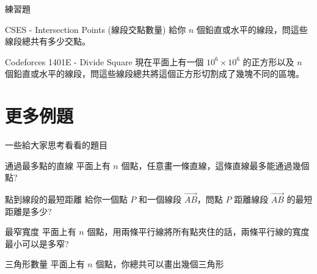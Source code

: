 \documentclass[aspectratio=169]{beamer}
\begin{document}
\begin{frame}{練習題}
    \begin{block}{CSES - Intersection Points (線段交點數量)}
        給你 $n$ 個鉛直或水平的線段，問這些線段總共有多少交點。
    \end{block}
    
    \begin{block}{Codeforces 1401E - Divide Square}
        現在平面上有一個 $10^6 \times 10^6$ 的正方形以及 $n$ 個鉛直或水平的線段，問這些線段總共將這個正方形切割成了幾塊不同的區塊。
    \end{block}
\end{frame}

\section{更多例題}

\begin{frame}{一些給大家思考看看的題目}
    \begin{block}{通過最多點的直線}
        平面上有 $n$ 個點，任意畫一條直線，這條直線最多能通過幾個點?
    \end{block}
    
    \begin{block}{點到線段的最短距離}
        給你一個點 $P$ 和一個線段 $\overrightarrow{AB}$，問點 $P$ 距離線段 $\overrightarrow{AB}$ 的最短距離是多少?
    \end{block}
    
    \begin{block}{最窄寬度}
        平面上有 $n$ 個點，用兩條平行線將所有點夾住的話，兩條平行線的寬度最小可以是多窄?
    \end{block}
    
    \begin{block}{三角形數量}
        平面上有 $n$ 個點，你總共可以畫出幾個三角形
    \end{block}
\end{frame}
\end{document}
